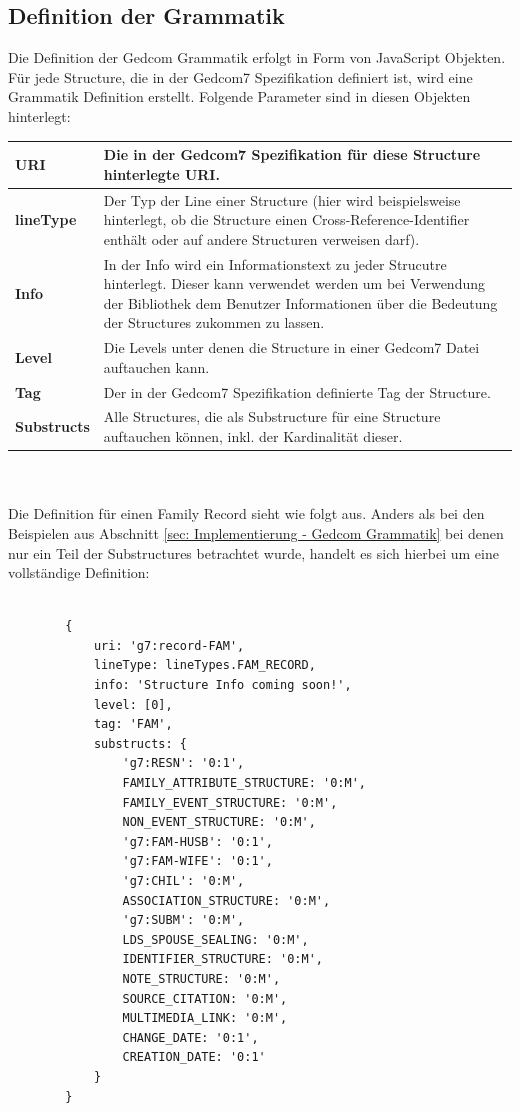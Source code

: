 \subsection{Definition der Grammatik}
\label{subsec: Implementierung - Grammatik Generator - Definition der Grammatik}
Die Definition der Gedcom Grammatik erfolgt in Form von JavaScript Objekten. Für jede Structure, die in der Gedcom7 Spezifikation definiert ist, wird eine Grammatik Definition erstellt. Folgende Parameter sind in diesen Objekten hinterlegt:
\bgroup
\def\arraystretch{1.5}%
\setlength{\tabcolsep}{18pt}
\begin{tabular}{|p{2cm}|p{10cm}|}
	\hline
	\textbf{URI} & Die in der Gedcom7 Spezifikation für diese Structure hinterlegte URI. \\
	\hline
	\textbf{lineType} & Der Typ der Line einer Structure (hier wird beispielsweise hinterlegt, ob die Structure einen Cross-Reference-Identifier enthält oder auf andere Structuren verweisen darf). \\
	\hline
	\textbf{Info} & In der Info wird ein Informationstext zu jeder Strucutre hinterlegt. Dieser kann verwendet werden um bei Verwendung der Bibliothek dem Benutzer Informationen über die Bedeutung der Structures zukommen zu lassen.\\
	\hline
	\textbf{Level} & Die Levels unter denen die Structure in einer Gedcom7 Datei auftauchen kann.\\
	\hline
	\textbf{Tag} & Der in der Gedcom7 Spezifikation definierte Tag der Structure.\\
	\hline
	\textbf{Substructs} & Alle Structures, die als Substructure für eine Structure auftauchen können, inkl. der Kardinalität dieser.\\
	\hline
\end{tabular}
\egroup
\\ \\
Die Definition für einen Family Record sieht wie folgt aus. Anders als bei den Beispielen aus Abschnitt \ref{sec: Implementierung - Gedcom Grammatik} bei denen nur ein Teil der Substructures betrachtet wurde, handelt es sich hierbei um eine vollständige Definition:
\\ \\
\begin{minipage}{1.0\textwidth} \small
	\begin{lstlisting}
		{
			uri: 'g7:record-FAM',
			lineType: lineTypes.FAM_RECORD,
			info: 'Structure Info coming soon!',
			level: [0],
			tag: 'FAM',
			substructs: {
				'g7:RESN': '0:1',
				FAMILY_ATTRIBUTE_STRUCTURE: '0:M',
				FAMILY_EVENT_STRUCTURE: '0:M',
				NON_EVENT_STRUCTURE: '0:M',
				'g7:FAM-HUSB': '0:1',
				'g7:FAM-WIFE': '0:1',
				'g7:CHIL': '0:M',
				ASSOCIATION_STRUCTURE: '0:M',
				'g7:SUBM': '0:M',
				LDS_SPOUSE_SEALING: '0:M',
				IDENTIFIER_STRUCTURE: '0:M',
				NOTE_STRUCTURE: '0:M',
				SOURCE_CITATION: '0:M',
				MULTIMEDIA_LINK: '0:M',
				CHANGE_DATE: '0:1',
				CREATION_DATE: '0:1'
			}
		}
	\end{lstlisting}
	\label{lst: Grammatik Definition Family}
\end{minipage}
